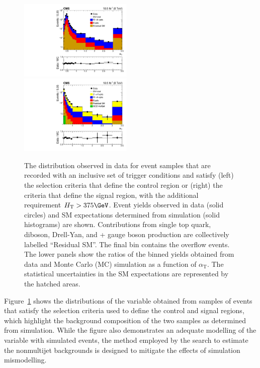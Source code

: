 \begin{figure}[h!]
  \centering
  \includegraphics[width=0.48\textwidth]{Figure_002-a.pdf} ~~
  \includegraphics[width=0.48\textwidth]{Figure_002-b.pdf}
  \caption{The \alphat distribution observed in data for event samples
    that are recorded with an inclusive set of trigger conditions and
    satisfy (left) the selection criteria that define the \mj control
    region or (right) the criteria that define the signal region, with
    the additional requirement $\scalht > 375\GeV$. Event yields
    observed in data (solid circles) and SM expectations determined
    from simulation (solid histograms) are shown. Contributions from
    single top quark, diboson, Drell-Yan, and \ttbar + gauge boson
    production are collectively labelled ``Residual SM''. The final
    bin contains the overflow events. The lower panels show the ratios
    of the binned yields obtained from data and Monte Carlo (MC)
    simulation as a function of $\alpha_\text{T}$. The statistical
    uncertainties in the SM expectations are represented by the
    hatched areas. \label{fig:alphat}
  }
\end{figure}

Figure~\ref{fig:alphat} shows the distributions of the \alphat
variable obtained from samples of events that satisfy the selection
criteria used to define the \mj control and signal regions, which
highlight the background composition of the two samples as determined
from simulation. While the figure also demonstrates an adequate
modelling of the \alphat variable with simulated events, the method
employed by the search to estimate the nonmultijet backgrounds is
designed to mitigate the effects of simulation mismodelling. 

